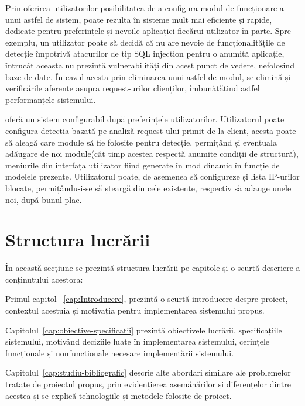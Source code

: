 Prin oferirea utilizatorilor posibilitatea de a configura modul de funcționare a unui astfel de sistem, poate rezulta în sisteme mult mai eficiente și rapide, dedicate pentru preferințele și nevoile aplicației fiecărui utilizator în parte. Spre exemplu, un utilizator poate să decidă că nu are nevoie de funcționalitățile de detecție împotrivă atacurilor de tip SQL injection pentru o anumită aplicație, întrucât aceasta nu prezintă vulnerabilități din acest punct de vedere, nefolosind baze de date. În cazul acesta prin eliminarea unui astfel de modul, se elimină și verificările aferente asupra request-urilor clienților, îmbunătățind astfel performanțele sistemului. 

\textit{\thesistitle}  oferă un sistem configurabil după preferințele utilizatorilor. Utilizatorul poate configura detecția bazată pe analiză request-ului primit de la client, acesta poate să aleagă care module să fie folosite pentru detecție, permițând și eventuala adăugare de noi module(cât timp acestea respectă anumite condiții de structură), meniurile din interfața utilizator fiind generate în mod dinamic în funcție de modelele prezente. Utilizatorul poate, de asemenea să configureze și lista IP-urilor blocate, permițându-i-se să șteargă din cele existente, respectiv să adauge unele noi, după bunul plac. 



 \section{Structura lucrării}
În această secțiune se prezintă structura lucrării pe capitole și o scurtă descriere a conținutului acestora: 

Primul capitol ~\ref{cap:Introducere},  prezintă o scurtă introducere despre proiect, contextul acestuia și motivația pentru implementarea sistemului propus. 

Capitolul~\ref{cap:obiective-specificatii}  prezintă obiectivele lucrării, specificațiile sistemului, motivând deciziile luate în implementarea sistemului, cerințele funcționale și nonfunctionale necesare implementării sistemului. 

Capitolul~\ref{cap:studiu-bibliografic}  descrie alte abordări similare ale problemelor tratate de proiectul propus, prin evidențierea asemănărilor și diferențelor dintre acestea și se explică tehnologiile și metodele folosite de proiect. 
 
